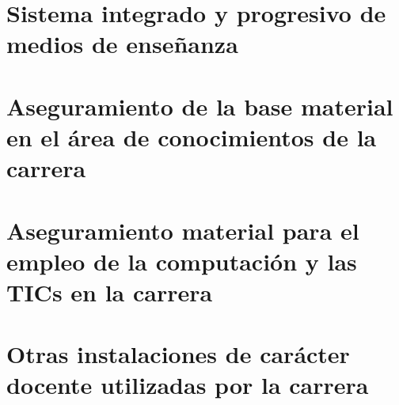 \section{Sistema integrado y progresivo de medios de enseñanza}



\section{Aseguramiento de la base material en el área de conocimientos de la carrera}



\section{Aseguramiento material para el empleo de la computación y las TICs en la carrera}



\section{Otras instalaciones de carácter docente utilizadas por la carrera}

